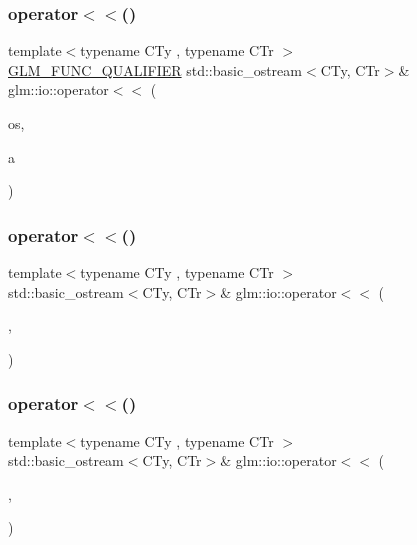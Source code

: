 \subsubsection{\texorpdfstring{operator$<$$<$()}{operator<<()}\hspace{0.1cm}{\footnotesize\ttfamily [4/8]}}
{\footnotesize\ttfamily template$<$typename C\+Ty , typename C\+Tr $>$ \\
\hyperlink{setup_8hpp_a33fdea6f91c5f834105f7415e2a64407}{G\+L\+M\+\_\+\+F\+U\+N\+C\+\_\+\+Q\+U\+A\+L\+I\+F\+I\+ER} std\+::basic\+\_\+ostream$<$C\+Ty, C\+Tr$>$\& glm\+::io\+::operator$<$$<$ (\begin{DoxyParamCaption}\item[{std\+::basic\+\_\+ostream$<$ C\+Ty, C\+Tr $>$ \&}]{os,  }\item[{\hyperlink{structglm_1_1io_1_1order}{order} const \&}]{a }\end{DoxyParamCaption})}

\mbox{\label{namespaceglm_1_1io_a296b3e794144975434f9419d1b293ed5}} 
\subsubsection{\texorpdfstring{operator$<$$<$()}{operator<<()}\hspace{0.1cm}{\footnotesize\ttfamily [5/8]}}
{\footnotesize\ttfamily template$<$typename C\+Ty , typename C\+Tr $>$ \\
std\+::basic\+\_\+ostream$<$C\+Ty, C\+Tr$>$\& glm\+::io\+::operator$<$$<$ (\begin{DoxyParamCaption}\item[{std\+::basic\+\_\+ostream$<$ C\+Ty, C\+Tr $>$ \&}]{,  }\item[{\hyperlink{structglm_1_1io_1_1delimeter}{delimeter}$<$ C\+Ty $>$ const \&}]{ }\end{DoxyParamCaption})}

\mbox{\label{namespaceglm_1_1io_aa5761ee427320d2121a97a7450256e3b}} 
\subsubsection{\texorpdfstring{operator$<$$<$()}{operator<<()}\hspace{0.1cm}{\footnotesize\ttfamily [6/8]}}
{\footnotesize\ttfamily template$<$typename C\+Ty , typename C\+Tr $>$ \\
std\+::basic\+\_\+ostream$<$C\+Ty, C\+Tr$>$\& glm\+::io\+::operator$<$$<$ (\begin{DoxyParamCaption}\item[{std\+::basic\+\_\+ostream$<$ C\+Ty, C\+Tr $>$ \&}]{,  }\item[{\hyperlink{structglm_1_1io_1_1precision}{precision} const \&}]{ }\end{DoxyParamCaption})}

